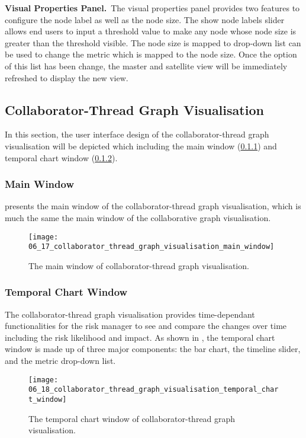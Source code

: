 \textbf{Visual Properties Panel.}~The visual properties panel provides two features to configure the node label as well as the node size. The show node labels slider allows end users to input a threshold value to make any node whose node size is greater than the threshold visible. The node size is mapped to drop-down list can be used to change the metric which is mapped to the node size. Once the option of this list has been change, the master and satellite view will be immediately refreshed to display the new view.

\subsection{Collaborator-Thread Graph Visualisation}
In this section, the user interface design of the collaborator-thread graph visualisation will be depicted which including the main window (\ref{sec:c_t_graph_main_window}) and temporal chart window (\ref{sec:c_t_graph_temporal_chart_window}).

\subsubsection{Main Window} \label{sec:c_t_graph_main_window}
 presents the main window of the collaborator-thread graph visualisation, which is much the same the main window of the collaborative graph visualisation.

\begin{figure}[!htb]
  \centering
  \texttt{[image: 06\_17\_collaborator\_thread\_graph\_visualisation\_main\_window]}
  \caption{The main window of collaborator-thread graph visualisation.}
  \label{Figure:06_17}
\end{figure}

\subsubsection{Temporal Chart Window} \label{sec:c_t_graph_temporal_chart_window}
The collaborator-thread graph visualisation provides time-dependant functionalities for the risk manager to see and compare the changes over time including the risk likelihood and impact. As shown in , the temporal chart window is made up of three major components: the bar chart, the timeline slider, and the metric drop-down list.

\begin{figure}[!htb]
  \centering
  \texttt{[image: 06\_18\_collaborator\_thread\_graph\_visualisation\_temporal\_chart\_window]}
  \caption{The temporal chart window of collaborator-thread graph visualisation.}
  \label{Figure:06_18}
\end{figure}

